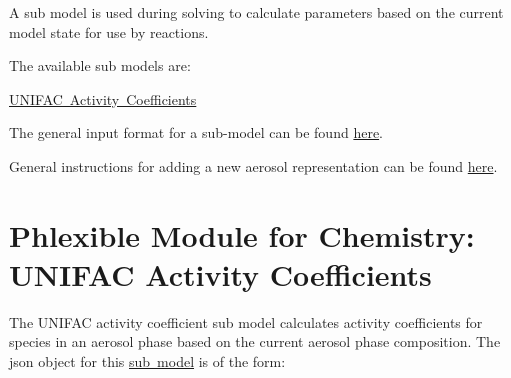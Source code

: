 A sub model is used during solving to calculate parameters based on the current model state for use by reactions.

The available sub models are\+:
\begin{DoxyItemize}
\item \mbox{\hyperlink{phlex_sub_model_UNIFAC}{U\+N\+I\+F\+AC Activity Coefficients}}
\end{DoxyItemize}

The general input format for a sub-\/model can be found \mbox{\hyperlink{input_format_sub_model}{here}}.

General instructions for adding a new aerosol representation can be found \mbox{\hyperlink{phlex_sub_model_add}{here}}. \hypertarget{phlex_sub_model_UNIFAC}{}\section{Phlexible Module for Chemistry\+: U\+N\+I\+F\+AC Activity Coefficients}\label{phlex_sub_model_UNIFAC}
The U\+N\+I\+F\+AC activity coefficient sub model calculates activity coefficients for species in an aerosol phase based on the current aerosol phase composition. The {\ttfamily json} object for this \mbox{\hyperlink{phlex_sub_model}{sub model}} is of the form\+:


